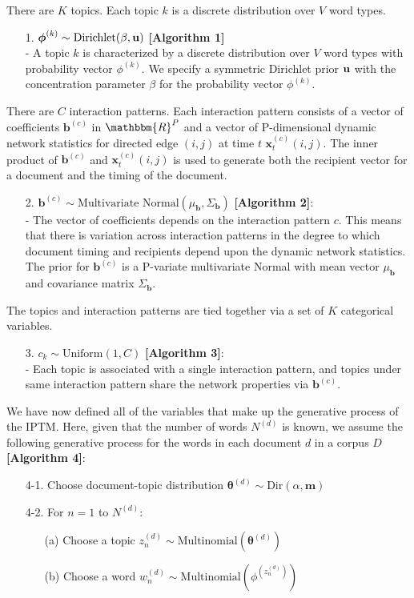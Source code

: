 \documentclass[a4paper]{article}
\begin{document}
There are $K$ topics. Each topic $k$ is a discrete distribution over $V$ word types.
\begin{itemize}
	\item[1.] {$\boldsymbol{\phi}^{(k)} \sim \mbox{Dirichlet}(\beta, \bf u)$} \textbf{[Algorithm 1]}\\
	- A topic $k$ is characterized by a discrete distribution over $V$ word types with probability vector $\phi^{(k)}$. We specify a symmetric Dirichlet prior $\bf u$ with the concentration parameter $\beta$ for the probability vector $\phi^{(k)}$.
\end{itemize}
\noindent There are $C$ interaction patterns. Each interaction pattern consists of a vector of coefficients $\boldsymbol{b}^{(c)}$ in $\mathbbm{R}^{P}$ and a vector of P-dimensional dynamic network statistics for directed edge $(i, j)$ at time $t$ $\boldsymbol{x}^{(c)}_t(i, j)$. The inner product of $\boldsymbol{b}^{(c)}$ and $\boldsymbol{x}^{(c)}_t(i, j)$ is used to generate both the recipient vector for a document and the timing of the document.
\begin{itemize}
	\item[2.] $\boldsymbol{b}^{(c)}\sim \mbox{Multivariate Normal}(\mu_{\boldsymbol{b}}, \Sigma_{\boldsymbol{b}})$ \textbf{[Algorithm 2]}: \\
		- The vector of coefficients depends on the interaction pattern $c$. This means that there is variation across interaction patterns in the degree to which document timing and recipients depend upon the dynamic network statistics. The prior for $\boldsymbol{b}^{(c)}$ is a P-variate multivariate Normal with mean vector $\mu_{\boldsymbol{b}}$ and covariance matrix $\Sigma_{\boldsymbol{b}}$.
	\end{itemize}
\noindent The topics and interaction patterns are tied together via a set of $K$ categorical variables.
\begin{itemize}
	\item[3.] $c_k\sim \mbox{Uniform}(1, C)$ \textbf{[Algorithm 3]}: \\
	- Each topic is associated with a single interaction pattern, and topics under same interaction pattern share the network properties via $\boldsymbol{b}^{(c)}$.
\end{itemize}

 We have now defined all of the variables that make up the generative process of the IPTM.  Here, given that the number of words $N^{(d)}$ is known, we assume the following generative process for the words in each document $d$ in a corpus $D$ \textbf{[Algorithm 4]}:
\begin{itemize}
	\item[4-1.] Choose document-topic distribution $\boldsymbol{\theta}^{(d)}\sim \mbox{Dir}(\alpha, \boldsymbol{m})$
	\item[4-2.] For $n=1$ to $N^{(d)}$:
	\begin{itemize}
		\item[(a)] Choose a topic $z_n^{(d)} \sim \mbox{Multinomial}(\boldsymbol{\theta}^{(d)})$
		\item[(b)] Choose a word $w_n^{(d)} \sim\mbox{Multinomial} (\phi^{(z_n^{(d)})})$
	\end{itemize}
\end{itemize}
\end{document}
